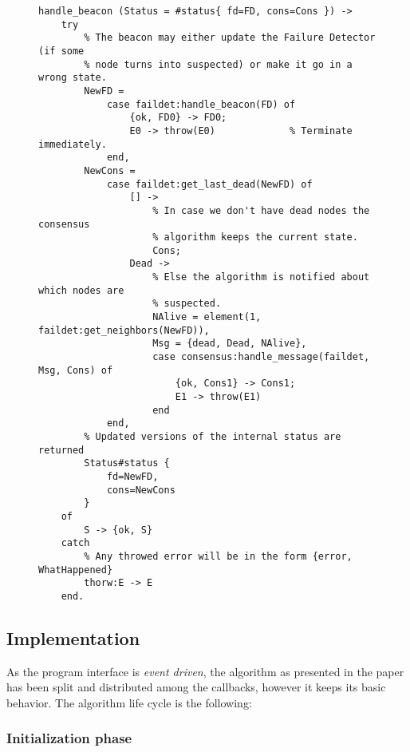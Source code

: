 \begin{itemize}
            \begin{figure}[hbt]
            \begin{lstlisting}[caption={Events from the \emph{Failure
                                        Detector}},
                               label={code:FromFaildet}]
handle_beacon (Status = #status{ fd=FD, cons=Cons }) ->
    try
        % The beacon may either update the Failure Detector (if some
        % node turns into suspected) or make it go in a wrong state.
        NewFD =
            case faildet:handle_beacon(FD) of
                {ok, FD0} -> FD0;
                E0 -> throw(E0)             % Terminate immediately.
            end,
        NewCons =
            case faildet:get_last_dead(NewFD) of
                [] ->
                    % In case we don't have dead nodes the consensus
                    % algorithm keeps the current state.
                    Cons;
                Dead ->
                    % Else the algorithm is notified about which nodes are
                    % suspected.
                    NAlive = element(1, faildet:get_neighbors(NewFD)),
                    Msg = {dead, Dead, NAlive},
                    case consensus:handle_message(faildet, Msg, Cons) of
                        {ok, Cons1} -> Cons1;
                        E1 -> throw(E1)
                    end
            end,
        % Updated versions of the internal status are returned
        Status#status {
            fd=NewFD,
            cons=NewCons
        }
    of
        S -> {ok, S}
    catch
        % Any throwed error will be in the form {error, WhatHappened}
        thorw:E -> E
    end.
            \end{lstlisting}
            \end{figure}

\end{itemize}


\subsection{Implementation}

As the program interface is \emph{event driven}, the algorithm as
presented in the paper has been split and distributed among the callbacks,
however it keeps its basic behavior. The algorithm life cycle is the
following:

\subsubsection{Initialization phase}

